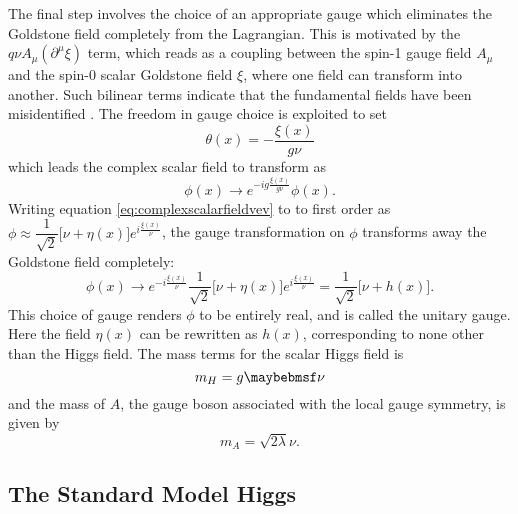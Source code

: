 The final step involves the choice of an appropriate gauge which eliminates the Goldstone field completely from the Lagrangian. This is motivated by the $q\nu A_{\mu}({\partial^{\mu}\xi})$ term, which reads as a coupling between the spin-1 gauge field $A_{\mu}$ and the spin-0 scalar Goldstone field $\xi$, where one field can transform into another. Such bilinear terms indicate that the fundamental fields have been misidentified \cite{Griffiths:2008zz}. The freedom in gauge choice is exploited to set 
\begin{equation}
    \theta(x)=-\dfrac{\xi(x)}{g\nu}
\end{equation}
which leads the complex scalar field to transform as 
\begin{equation}
    \phi(x)\rightarrow e^{-ig\frac{\xi(x)}{g\nu}}\phi(x).
\end{equation}
Writing equation \ref{eq:complexscalarfieldvev} to to first order as $\phi\approx\dfrac{1}{\sqrt{2}}\Big[\nu+\eta(x)\Big]e^{i\frac{\xi(x)}{\nu}}$, the gauge transformation on $\phi$ transforms away the Goldstone field completely:
\begin{equation}
    \phi(x)\rightarrow e^{-i\frac{\xi(x)}{\nu}} \dfrac{1}{\sqrt{2}}\Big[\nu+\eta(x)\Big]e^{i\frac{\xi(x)}{\nu}}
    = \dfrac{1}{\sqrt{2}}\Big[\nu+h(x)\Big].
\end{equation}
This choice of gauge renders $\phi$ to be entirely real, and is called the unitary gauge. Here the field $\eta(x)$ can be rewritten as $h(x)$, corresponding to none other than the Higgs field. The mass terms for the scalar Higgs field is 
\begin{equation}
    m_{\Higgs} = g\nu
\end{equation}
and the mass of $A$, the gauge boson associated with the local gauge symmetry, is given by
\begin{equation}
    m_A=\sqrt{2\lambda}\nu.
\end{equation}

\subsection{The Standard Model Higgs}

